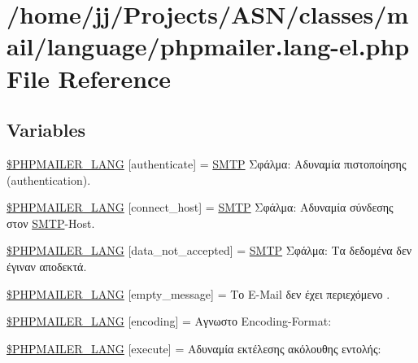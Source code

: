 \hypertarget{phpmailer_8lang-el_8php}{}\section{/home/jj/\+Projects/\+A\+S\+N/classes/mail/language/phpmailer.lang-\/el.php File Reference}
\label{phpmailer_8lang-el_8php}
\subsection*{Variables}
\begin{DoxyCompactItemize}
\item 
\hyperlink{phpmailer_8lang-el_8php_a2cb33073c989b85580748e331ed8b4aa}{\$\+P\+H\+P\+M\+A\+I\+L\+E\+R\+\_\+\+L\+A\+NG} \mbox{[}\textquotesingle{}authenticate\textquotesingle{}\mbox{]} = \textquotesingle{}\hyperlink{class_s_m_t_p}{S\+M\+TP} Σφάλμα\+: Αδυναμία πιστοποίησης (authentication).\textquotesingle{}
\item 
\hyperlink{phpmailer_8lang-el_8php_a2ee0cc637a06b96e45600db31c6799ee}{\$\+P\+H\+P\+M\+A\+I\+L\+E\+R\+\_\+\+L\+A\+NG} \mbox{[}\textquotesingle{}connect\+\_\+host\textquotesingle{}\mbox{]} = \textquotesingle{}\hyperlink{class_s_m_t_p}{S\+M\+TP} Σφάλμα\+: Αδυναμία σύνδεσης στον \hyperlink{class_s_m_t_p}{S\+M\+TP}-\/Host.\textquotesingle{}
\item 
\hyperlink{phpmailer_8lang-el_8php_a814c6b191205d2361b3233e9c9d6fda5}{\$\+P\+H\+P\+M\+A\+I\+L\+E\+R\+\_\+\+L\+A\+NG} \mbox{[}\textquotesingle{}data\+\_\+not\+\_\+accepted\textquotesingle{}\mbox{]} = \textquotesingle{}\hyperlink{class_s_m_t_p}{S\+M\+TP} Σφάλμα\+: Τα δεδομένα δεν έγιναν αποδεκτά.\textquotesingle{}
\item 
\hyperlink{phpmailer_8lang-el_8php_a33772099f637c9d6c2cd7425e0e37fed}{\$\+P\+H\+P\+M\+A\+I\+L\+E\+R\+\_\+\+L\+A\+NG} \mbox{[}\textquotesingle{}empty\+\_\+message\textquotesingle{}\mbox{]} = \textquotesingle{}Το E-\/Mail δεν έχει περιεχόμενο .\textquotesingle{}
\item 
\hyperlink{phpmailer_8lang-el_8php_a817f7283f3d54c970a0c10305cc668cc}{\$\+P\+H\+P\+M\+A\+I\+L\+E\+R\+\_\+\+L\+A\+NG} \mbox{[}\textquotesingle{}encoding\textquotesingle{}\mbox{]} = \textquotesingle{}Αγνωστο Encoding-\/Format\+: \textquotesingle{}
\item 
\hyperlink{phpmailer_8lang-el_8php_a668217a9563a168f30f2a8548b6ed5a9}{\$\+P\+H\+P\+M\+A\+I\+L\+E\+R\+\_\+\+L\+A\+NG} \mbox{[}\textquotesingle{}execute\textquotesingle{}\mbox{]} = \textquotesingle{}Αδυναμία εκτέλεσης ακόλουθης εντολής\+: \textquotesingle{}

\end{DoxyCompactItemize}
